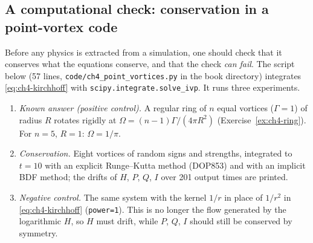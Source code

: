\subsection{A computational check: conservation in a point-vortex code}\label{sec:ch4-pvcode}
Before any physics is extracted from a simulation, one should check that it conserves what the equations
conserve, and that the check \emph{can fail}. The script below (57 lines,
\texttt{code/ch4\_point\_vortices.py} in the book directory) integrates \eqref{eq:ch4-kirchhoff} with
\texttt{scipy.integrate.solve\_ivp}. It runs three experiments.
\begin{enumerate}
\item \emph{Known answer (positive control).} A regular ring of $n$ equal vortices ($\Gamma=1$) of radius $R$
rotates rigidly at $\Omega = (n-1)\Gamma/(4\pi R^2)$ (Exercise~\ref{ex:ch4-ring}). For $n=5$, $R=1$:
$\Omega = 1/\pi$.
\item \emph{Conservation.} Eight vortices of random signs and strengths, integrated to $t=10$ with an explicit
Runge--Kutta method (DOP853) and with an implicit BDF method; the drifts of $H$, $P$, $Q$, $I$ over 201 output times
are printed.
\item \emph{Negative control.} The same system with the kernel $1/r$ in place of $1/r^2$ in
\eqref{eq:ch4-kirchhoff} (\texttt{power=1}). This is no longer the flow generated by the logarithmic $H$, so $H$
must drift, while $P$, $Q$, $I$ should still be conserved by symmetry.
\end{enumerate}

